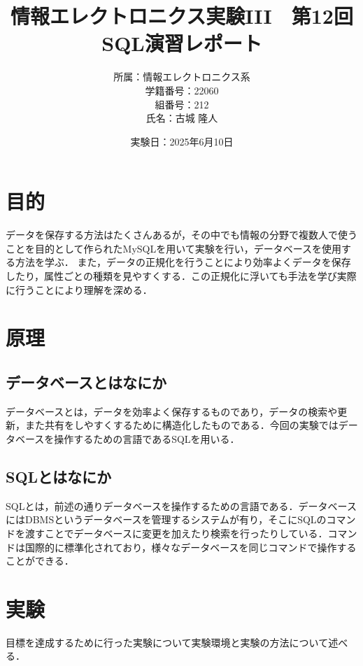 \documentclass[a4paper,11pt]{ltjsarticle}
\begin{document}
\title{情報エレクトロニクス実験III　第12回SQL演習レポート}
\author{
  所属：情報エレクトロニクス系\\
  学籍番号：22060\\
  組番号：212\\
  氏名：古城 隆人
}
\date{実験日：2025年6月10日}
\maketitle

\section{目的}
データを保存する方法はたくさんあるが，その中でも情報の分野で複数人で使うことを目的として作られたMySQLを用いて実験を行い，データベースを使用する方法を学ぶ．
また，データの正規化を行うことにより効率よくデータを保存したり，属性ごとの種類を見やすくする．この正規化に浮いても手法を学び実際に行うことにより理解を深める．
\section{原理}
\subsection{データベースとはなにか}
データベースとは，データを効率よく保存するものであり，データの検索や更新，また共有をしやすくするために構造化したものである．今回の実験ではデータベースを操作するための言語であるSQLを用いる．
\subsection{SQLとはなにか}
SQLとは，前述の通りデータベースを操作するための言語である．データベースにはDBMSというデータベースを管理するシステムが有り，そこにSQLのコマンドを渡すことでデータベースに変更を加えたり検索を行ったりしている．コマンドは国際的に標準化されており，様々なデータベースを同じコマンドで操作することができる．
\section{実験}
目標を達成するために行った実験について実験環境と実験の方法について述べる．
\end{document}
